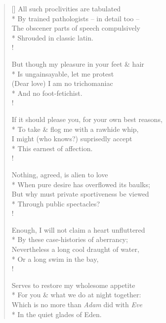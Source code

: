 \documentclass[MAIN]{subfiles}
\begin{document}
\settowidth{\versewidth}{By trained pathologists -- in detail too --}
\begin{verse}[\versewidth]
All such proclivities are tabulated\\*
By trained pathologists -- in detail too --\\
The obscener parts of speech compulsively\\*
\vin Shrouded in classic latin.\\!

But though my pleasure in your feet \& hair\\*
Is ungainsayable, let me protest\\
(Dear love) I am no trichomaniac\\*
\vin And no foot-fetichist.\\!

If it should please you, for your own best reasons,\\*
To take \& flog me with a rawhide whip,\\
I might (who knows?) suprisedly accept\\*
\vin This earnest of affection.\\!

Nothing, agreed, is alien to love\\*
When pure desire has overflowed its baulks;\\
But why must private sportiveness be viewed\\*
\vin Through public spectacles?\\!

Enough, I will not claim a heart unfluttered\\*
By these case-histories of aberrancy;\\
Nevertheless a long cool draught of water,\\*
\vin Or a long swim in the bay,\\!

Serves to restore my wholesome appetite\\*
For you \& what we do at night together:\\
Which is no more than \emph{Adam} did with \emph{Eve}\\*
\vin In the quiet glades of Eden.
\end{verse}
\end{document}
